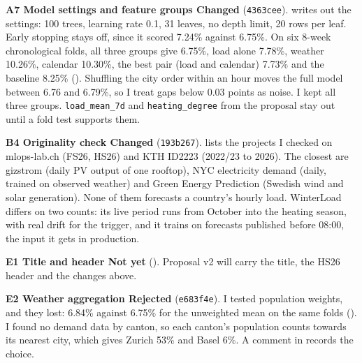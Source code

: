 \documentclass[10pt,a4paper]{article}
\newcommand{\point}[4]{\textbf{#1 \textperiodcentered{} #2 \textperiodcentered{} #3}\if\relax\detokenize{#4}\relax\else{} (\texttt{#4})\fi.}
\begin{document}
\point{A7}{Model settings and feature groups}{Changed}{4363cee}
 writes out the settings: 100 trees, learning rate 0.1, 31 leaves, no depth limit, 20 rows
per leaf. Early stopping stays off, since it scored 7.24\% against 6.75\%. On six 8-week chronological folds, all three groups
give 6.75\%, load alone 7.78\%, weather 10.26\%, calendar 10.30\%, the best pair (load and calendar) 7.73\% and the baseline
8.25\% (). Shuffling the city order within an hour moves the full model between 6.76
and 6.79\%, so I treat gaps below 0.03 points as noise. I kept all three groups. \texttt{load\_mean\_7d} and
\texttt{heating\_degree} from the proposal stay out until a fold test supports them.

\point{B4}{Originality check}{Changed}{193b267}
 lists the projects I checked on mlops-lab.ch (FS26, HS26) and KTH ID2223 (2022/23 to 2026). The closest are
gizstrom (daily PV output of one rooftop), NYC electricity demand (daily, trained on observed weather) and Green Energy Prediction
(Swedish wind and solar generation). None of them forecasts a country's hourly load. WinterLoad differs on two counts: its live period runs from
October into the heating season, with real drift for the trigger, and it trains on forecasts published before 08:00, the
input it gets in production.

\point{E1}{Title and header}{Not yet}{}
Proposal v2 will carry the title, the HS26 header and the changes above.

\point{E2}{Weather aggregation}{Rejected}{e683f4e}
I tested population weights, and they lost: 6.84\% against 6.75\% for the unweighted mean on the same folds
(). I found no demand data by canton, so each canton's population counts towards
its nearest city, which gives Zurich 53\% and Basel 6\%. A comment in  records the choice.
\end{document}
